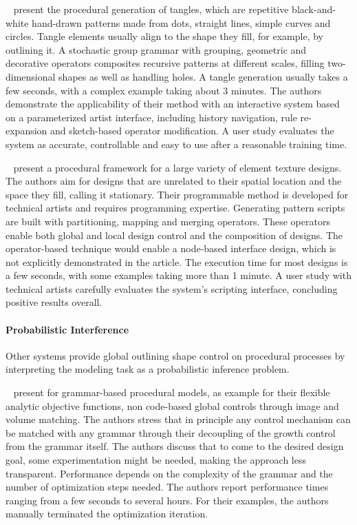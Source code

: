 \citeauthor*{santoni_2016_ggp}~\cite{santoni_2016_ggp} present the procedural generation of tangles, which are repetitive black-and-white hand-drawn patterns made from dots, straight lines, simple curves and circles. Tangle elements usually align to the shape they fill, for example, by outlining it. A stochastic group grammar with grouping, geometric and decorative operators composites recursive patterns at different scales, filling two-dimensional shapes as well as handling holes. A tangle generation usually takes a few seconds, with a complex example taking about 3 minutes. The authors demonstrate the applicability of their method with an interactive system based on a parameterized artist interface, including history navigation, rule re-expansion and sketch-based operator modification. A user study evaluates the system as accurate, controllable and easy to use after a reasonable training time.

\citeauthor*{loi_2017_pae}~\cite{loi_2017_pae} present a procedural framework for a large variety of element texture designs. The authors aim for designs that are unrelated to their spatial location and the space they fill, calling it stationary. Their programmable method is developed for technical artists and requires programming expertise. Generating pattern scripts are built with partitioning, mapping and merging operators. These operators enable both global and local design control and the composition of designs. The operator-based technique would enable a node-based interface design, which is not explicitly demonstrated in the article. The execution time for most designs is a few seconds, with some examples taking more than 1 minute. A user study with technical artists carefully evaluates the system's scripting interface, concluding positive results overall.

\paragraph*{Probabilistic Interference}
\label{para:analysis_rulebased_shapes_probabilistic}

Other systems provide global outlining shape control on procedural processes by interpreting the modeling task as a probabilistic inference problem.

\citeauthor*{talton_2011_mpm}~\cite{talton_2011_mpm} present for grammar-based procedural models, as example for their flexible analytic objective functions, non code-based global controls through image and volume matching. The authors stress that in principle any control mechanism can be matched with any grammar through their decoupling of the growth control from the grammar itself. The authors discuss that to come to the desired design goal, some experimentation might be needed, making the approach less transparent. Performance depends on the complexity of the grammar and the number of optimization steps needed. The authors report performance times ranging from a few seconds to several hours. For their examples, the authors manually terminated the optimization iteration.


